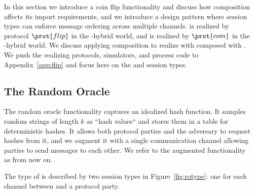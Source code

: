 
In this section we introduce a coin flip functionality \Fflip and discuss how composition affects its import requirements, and we introduce a design pattern where session types can enforce message ordering across multiple channels. 
\Fflip is realized by protocol $\prot{flip}$ in the \Fcom-hybrid world, and \Fcom is realized by $\prot{com}$ in the \Fropp-hybrid world.
We discuss applying composition to realize \Fflip with  composed with .
We push the realizing protocols, simulators, and process code to Appendix~\ref{app:flip} and focus here on the \Fflip and \Fropp session types.

\subsection{The Random Oracle}
The random oracle functionality captures an idealized hash function. It samples random strings of length $k$ as ``hash values`` and stores them in a table for deterministic hashes.
It allows both protocol parties and the adversary to request hashes from it, and we augment it with a single communication channel allowing parties to send messages to each other.
We refer to the augmented functionality as \Fropp from now on.

The type of \Fropp is described by two session types in Figure~\ref{fig:rotype}: one for each channel between \Fropp and a protocol party.

